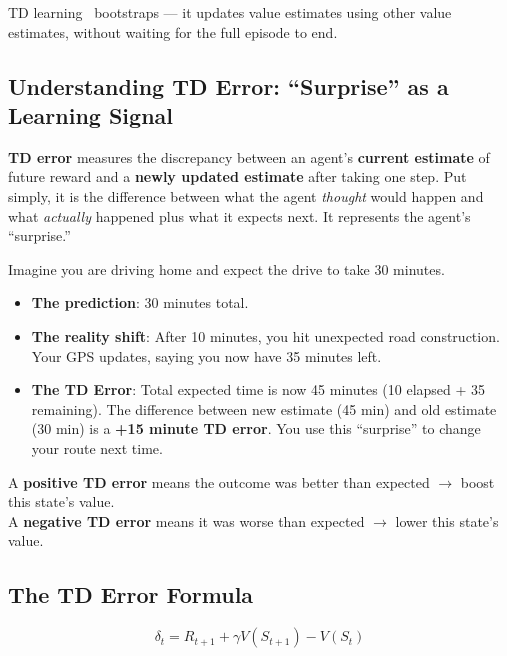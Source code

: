 TD learning~\cite{sutton1988learning} bootstraps --- it updates value estimates using other value estimates, without waiting for the full episode to end.

\subsection{Understanding TD Error: ``Surprise'' as a Learning Signal}
\label{understanding-td-error-surprise-as-a-learning-signal}

\textbf{TD error} measures the discrepancy between an agent’s \textbf{current estimate} of future reward and a \textbf{newly updated estimate} after taking one step. Put simply, it is the difference between what the agent \emph{thought} would happen and what \emph{actually} happened plus what it expects next. It represents the agent’s ``surprise.''

\begin{examplebox}
Imagine you are driving home and expect the drive to take 30 minutes.

\begin{itemize}
  \item \textbf{The prediction}: 30 minutes total.
  \item \textbf{The reality shift}: After 10 minutes, you hit unexpected road construction. Your GPS updates, saying you now have 35 minutes left.
  \item \textbf{The TD Error}: Total expected time is now 45 minutes (10 elapsed + 35 remaining). The difference between new estimate (45 min) and old estimate (30 min) is a \textbf{+15 minute TD error}. You use this ``surprise'' to change your route next time.
\end{itemize}

A \textbf{positive TD error} means the outcome was better than expected $\rightarrow$ boost this state’s value.\\

A \textbf{negative TD error} means it was worse than expected $\rightarrow$ lower this state’s value.
\end{examplebox}

\subsection{The TD Error Formula}
\label{the-td-error-formula}

\begin{equation}
\boxed{\delta_t = R_{t+1} + \gamma V(S_{t+1}) - V(S_t)}
\end{equation}

